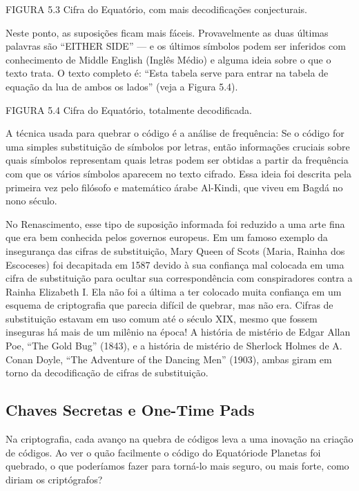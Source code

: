 \documentclass{book}
\begin{document}
FIGURA 5.3 Cifra do Equatório, com mais decodificações conjecturais.

Neste ponto, as suposições ficam mais fáceis. Provavelmente as duas últimas palavras são ``EITHER SIDE'' --- e os últimos símbolos podem ser inferidos com conhecimento de Middle English (Inglês Médio) e alguma ideia sobre o que o texto trata. O texto completo é: ``Esta tabela serve para entrar na tabela de equação da lua de ambos os lados'' (veja a Figura 5.4).

FIGURA 5.4 Cifra do Equatório, totalmente decodificada.

A técnica usada para quebrar o código é a análise de frequência: Se o código for uma simples substituição de símbolos por letras, então informações cruciais sobre quais símbolos representam quais letras podem ser obtidas a partir da frequência com que os vários símbolos aparecem no texto cifrado. Essa ideia foi descrita pela primeira vez pelo filósofo e matemático árabe Al-Kindi, que viveu em Bagdá no nono século.

No Renascimento, esse tipo de suposição informada foi reduzido a uma arte fina que era bem conhecida pelos governos europeus. Em um famoso exemplo da insegurança das cifras de substituição, Mary Queen of Scots (Maria, Rainha dos Escoceses) foi decapitada em 1587 devido à sua confiança mal colocada em uma cifra de substituição para ocultar sua correspondência com conspiradores contra a Rainha Elizabeth I. Ela não foi a última a ter colocado muita confiança em um esquema de criptografia que parecia difícil de quebrar, mas não era. Cifras de substituição estavam em uso comum até o século XIX, mesmo que fossem inseguras há mais de um milênio na época! A história de mistério de Edgar Allan Poe, ``The Gold Bug'' (1843), e a história de mistério de Sherlock Holmes de A. Conan Doyle, ``The Adventure of the Dancing Men'' (1903), ambas giram em torno da decodificação de cifras de substituição.


\subsection{Chaves Secretas e One-Time Pads}
\label{segredos:one-time-pads}

Na criptografia, cada avanço na quebra de códigos leva a uma inovação na criação de códigos. Ao ver o quão facilmente o código do Equatóriode Planetas foi quebrado, o que poderíamos fazer para torná-lo mais seguro, ou mais forte, como diriam os criptógrafos?
\end{document}
